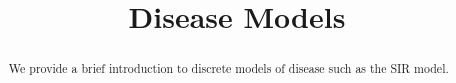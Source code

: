 \documentclass{ximera}
\title{Disease Models}
\begin{document}
  
\begin{abstract}  
We provide a brief introduction to discrete models of disease such as the SIR model.
\end{abstract}  
\maketitle

\section{}
\end{document}
